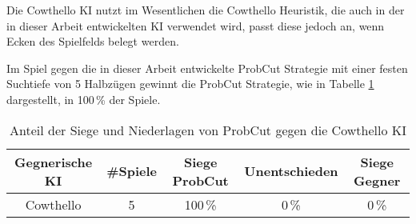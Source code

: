 Die Cowthello KI nutzt im Wesentlichen die Cowthello Heuristik, die auch in der in dieser Arbeit entwickelten KI
verwendet wird, passt diese jedoch an, wenn Ecken des Spielfelds belegt werden. \cite{cowthello}

Im Spiel gegen die in dieser Arbeit entwickelte ProbCut Strategie mit einer festen Suchtiefe von 5 Halbzügen gewinnt
die ProbCut Strategie, wie in Tabelle \ref{table:comp:cowthello} dargestellt, in 100\,\%  der Spiele.

\begin{table}[H]
\centering
\begin{tabular}{c|c|ccc}
\hline
Gegnerische KI & \#Spiele & Siege ProbCut & Unentschieden & Siege Gegner \\
\hline
Cowthello & 5 & 100\,\% & 0\,\% & 0\,\% \\
\hline
\end{tabular}
\caption{Anteil der Siege und Niederlagen von ProbCut gegen die Cowthello KI}
\label{table:comp:cowthello}
\end{table}